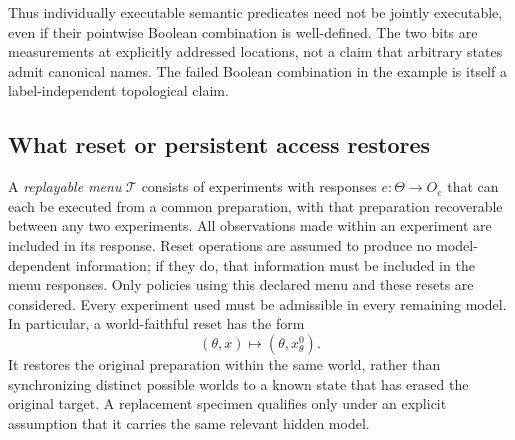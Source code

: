 \documentclass[11pt]{article}
\theoremstyle{definition}
\begin{document}
Thus individually executable semantic predicates need not be jointly
executable, even if their pointwise Boolean combination is well-defined.
The two bits are measurements at explicitly addressed locations, not a
claim that arbitrary states admit canonical names. The failed Boolean
combination in the example is itself a label-independent topological claim.

\subsection{What reset or persistent access restores}

A \emph{replayable menu} $\mathcal T$ consists of experiments with
responses $e:\Theta\to O_e$ that can each be executed from a common
preparation, with that preparation recoverable between any two experiments.
All observations made within an experiment are included in its response.
Reset operations are assumed to produce no model-dependent information;
if they do, that information must be included in the menu responses.
Only policies using this declared menu and these resets are considered.
Every experiment used must be admissible in every remaining model.
In particular, a world-faithful reset has the form
\[
 (\theta,x)\longmapsto(\theta,x^0_\theta).
\]
It restores the original preparation within the same world, rather than
synchronizing distinct possible worlds to a known state that has erased
the original target. A replacement specimen qualifies only under an
explicit assumption that it carries the same relevant hidden model.
\end{document}
